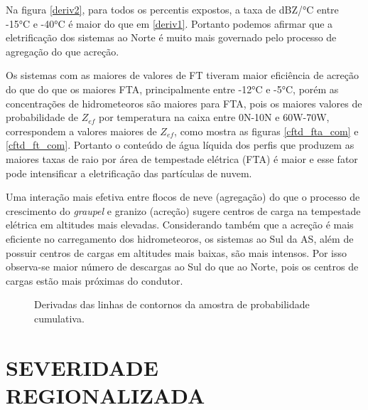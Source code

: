 Na figura \ref{deriv2}, para todos os percentis expostos, a taxa de dBZ/°C entre -15°C e -40°C é maior do que em \ref{deriv1}. Portanto podemos afirmar que a eletrificação dos sistemas ao Norte é muito mais governado pelo processo de agregação do que acreção. 

Os sistemas com as maiores de valores de FT tiveram maior eficiência de acreção do que do que os maiores FTA, principalmente entre -12°C e -5°C, porém as concentrações de hidrometeoros são maiores para FTA, pois os maiores valores de probabilidade de $Z_{ef}$ por temperatura na caixa entre 0N-10N e 60W-70W, correspondem a valores maiores de $Z_{ef}$, como mostra as figuras \ref{cftd_fta_com} e \ref{cftd_ft_com}. Portanto o conteúdo de água líquida dos perfis que produzem as maiores taxas de raio por área de tempestade elétrica (FTA) é maior e esse fator pode intensificar a eletrificação das partículas de nuvem.

Uma interação mais efetiva entre flocos de neve (agregação) do que o processo de crescimento do \textit{graupel} e granizo (acreção) sugere centros de carga na tempestade elétrica em altitudes mais elevadas. Considerando também que a acreção é mais eficiente no carregamento dos hidrometeoros, os sistemas ao Sul da AS, além de possuir centros de cargas em altitudes mais baixas, são mais intensos. Por isso observa-se maior número de descargas ao Sul do que ao Norte, pois os centros de cargas estão mais próximas do condutor.



\begin{figure}
  \caption{Derivadas das linhas de contornos da amostra de probabilidade cumulativa.}
\end{figure}


\section{SEVERIDADE REGIONALIZADA}

